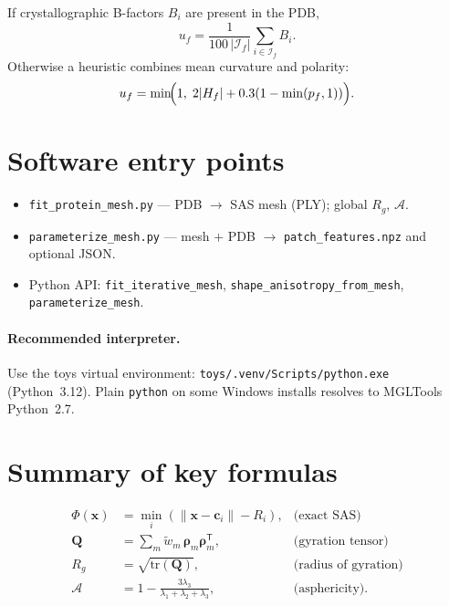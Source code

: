 \documentclass[11pt,a4paper]{article}
\begin{document}
If crystallographic B-factors $B_i$ are present in the PDB,
\begin{equation}
  u_f = \frac{1}{100\,|\mathcal{I}_f|}\sum_{i\in\mathcal{I}_f} B_i.
\end{equation}
Otherwise a heuristic combines mean curvature and polarity:
\begin{equation}
  u_f = \min\!\Bigl(1,\; 2|H_f| + 0.3(1-\min(p_f,1))\Bigr).
\end{equation}

\section{Software entry points}

\begin{itemize}
  \item \texttt{fit\_protein\_mesh.py} --- PDB $\to$ SAS mesh (PLY); global
        $R_g$, $\mathcal{A}$.
  \item \texttt{parameterize\_mesh.py} --- mesh $+$ PDB $\to$
        \texttt{patch\_features.npz} and optional JSON.
  \item Python API: \texttt{fit\_iterative\_mesh}, \texttt{shape\_anisotropy\_from\_mesh},
        \texttt{parameterize\_mesh}.
\end{itemize}

\paragraph{Recommended interpreter.}
Use the toys virtual environment:
\texttt{toys/.venv/Scripts/python.exe} (Python~3.12).
Plain \texttt{python} on some Windows installs resolves to MGLTools Python~2.7.

\section{Summary of key formulas}

\begin{align}
  \Phi(\mathbf{x}) &= \min_i(\|\mathbf{x}-\mathbf{c}_i\|-R_i),
  &\text{(exact SAS)} \\[4pt]
  \mathbf{Q} &= \sum_m \tilde{w}_m\,\boldsymbol{\rho}_m\boldsymbol{\rho}_m^{\mathsf{T}},
  &\text{(gyration tensor)} \\[4pt]
  R_g &= \sqrt{\mathrm{tr}(\mathbf{Q})},
  &\text{(radius of gyration)} \\[4pt]
  \mathcal{A} &= 1 - \frac{3\lambda_3}{\lambda_1+\lambda_2+\lambda_3},
  &\text{(asphericity)}.
\end{align}
\end{document}
